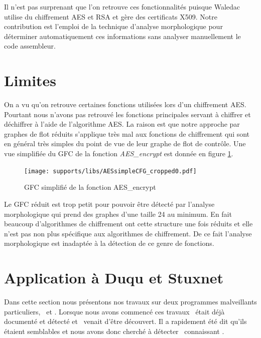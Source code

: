 Il n'est pas surprenant que l'on retrouve ces fonctionnalités puisque Waledac utilise du chiffrement AES et RSA et gère des certificats X509. Notre contribution est l'emploi de la technique d'analyse morphologique pour déterminer automatiquement ces informations sans analyser manuellement le code assembleur.

\section{Limites}
On a vu qu'on retrouve certaines fonctions utilisées lors d'un chiffrement AES.
Pourtant nous n'avons pas retrouvé les fonctions principales servant à chiffrer et déchiffrer à l'aide de l'algorithme AES.
La raison est que notre approche par graphes de flot réduits s'applique très mal aux fonctions de chiffrement qui sont en général très simples du point de vue de leur graphe de flot de contrôle.
Une vue simplifiée du GFC de la fonction \emph{AES\_encrypt} est donnée en figure \ref{fig:AES_encrypt_CFG}.

\begin{figure}[h]
\begin{center}
\texttt{[image: supports/libs/AESsimpleCFG\_cropped0.pdf]}

\end{center}
\caption{GFC simplifié de la fonction AES\_encrypt}
\label{fig:AES_encrypt_CFG}
\end{figure}

Le GFC réduit est trop petit pour pouvoir être détecté par l'analyse morphologique qui prend des graphes d'une taille 24 au minimum.
En fait beaucoup d'algorithmes de chiffrement ont cette structure une fois réduits et elle n'est pas non plus spécifique aux algorithmes de chiffrement. De ce fait l'analyse morphologique est inadaptée à la détection de ce genre de fonctions.

\section{Application à Duqu et Stuxnet}
Dans cette section nous présentons nos travaux sur deux programmes malveillants particuliers, \duqu\ et \stux.
Lorsque nous avons commencé ces travaux \stux\ était déjà documenté et détecté et \duqu\ venait d'être découvert.
Il a rapidement été dit qu'ils étaient semblables et nous avons donc cherché à détecter \duqu\ connaissant \stux.
\\

